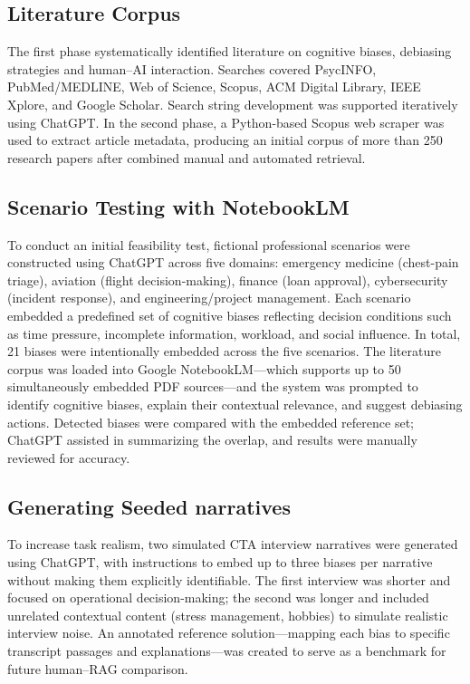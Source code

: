\documentclass[
  letterpaper,
  DIV=11,
  numbers=noendperiod]{scrartcl}
\begin{document}
\subsection{Literature Corpus}\label{literature-corpus}

The first phase systematically identified literature on cognitive
biases, debiasing strategies and human--AI interaction. Searches covered
PsycINFO, PubMed/MEDLINE, Web of Science, Scopus, ACM Digital Library,
IEEE Xplore, and Google Scholar. Search string development was supported
iteratively using ChatGPT. In the second phase, a Python-based Scopus
web scraper was used to extract article metadata, producing an initial
corpus of more than 250 research papers after combined manual and
automated retrieval.

\subsection{Scenario Testing with
NotebookLM}\label{scenario-testing-with-notebooklm}

To conduct an initial feasibility test, fictional professional scenarios
were constructed using ChatGPT across five domains: emergency medicine
(chest-pain triage), aviation (flight decision-making), finance (loan
approval), cybersecurity (incident response), and engineering/project
management. Each scenario embedded a predefined set of cognitive biases
reflecting decision conditions such as time pressure, incomplete
information, workload, and social influence. In total, 21 biases were
intentionally embedded across the five scenarios. The literature corpus
was loaded into Google NotebookLM---which supports up to 50
simultaneously embedded PDF sources---and the system was prompted to
identify cognitive biases, explain their contextual relevance, and
suggest debiasing actions. Detected biases were compared with the
embedded reference set; ChatGPT assisted in summarizing the overlap, and
results were manually reviewed for accuracy.

\subsection{Generating Seeded
narratives}\label{generating-seeded-narratives}

To increase task realism, two simulated CTA interview narratives were
generated using ChatGPT, with instructions to embed up to three biases
per narrative without making them explicitly identifiable. The first
interview was shorter and focused on operational decision-making; the
second was longer and included unrelated contextual content (stress
management, hobbies) to simulate realistic interview noise. An annotated
reference solution---mapping each bias to specific transcript passages
and explanations---was created to serve as a benchmark for future
human--RAG comparison.
\end{document}
